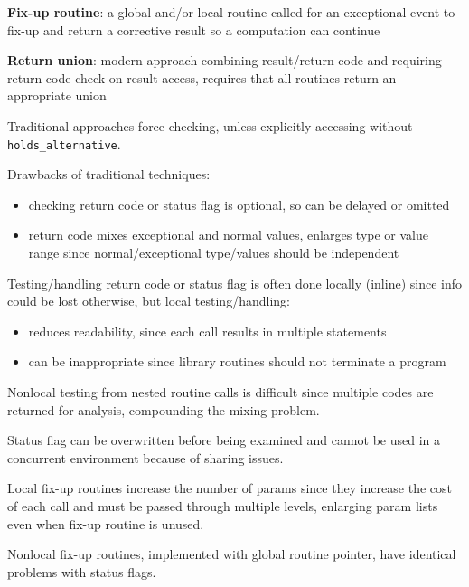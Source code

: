 \documentclass[11pt]{article}
\begin{document}
\textbf{Fix-up routine}: a global and/or local routine called for an exceptional event to fix-up and return
a corrective result so a computation can continue

\textbf{Return union}: modern approach combining result/return-code and requiring return-code check on result
access, requires that all routines return an appropriate union

Traditional approaches force checking, unless explicitly accessing without \texttt{holds\_alternative}.

Drawbacks of traditional techniques:
\begin{itemize}
\item checking return code or status flag is optional, so can be delayed or omitted
\item return code mixes exceptional and normal values, enlarges type or value range since normal/exceptional
type/values should be independent
\end{itemize}

Testing/handling return code or status flag is often done locally (inline) since info could be lost
otherwise, but local testing/handling:
\begin{itemize}
\item reduces readability, since each call results in multiple statements
\item can be inappropriate since library routines should not terminate a program
\end{itemize}

Nonlocal testing from nested routine calls is difficult since multiple codes are returned for analysis,
compounding the mixing problem.

Status flag can be overwritten before being examined and cannot be used in a concurrent environment
because of sharing issues.

Local fix-up routines increase the number of params since they increase the cost of each call and
must be passed through multiple levels, enlarging param lists even when fix-up routine is unused.

Nonlocal fix-up routines, implemented with global routine pointer, have identical problems with
status flags.
\end{document}
